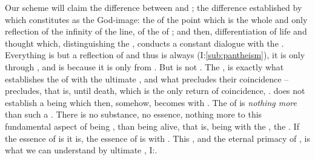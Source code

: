 Our scheme will claim the difference between  and ; the
difference established by  which constitutes  as the
God-image: the  of the point which is the whole and only
reflection of the infinity of the line, of the  of ; and
then, differentiation of life and thought which, distinguishing the
, conducts a constant dialogue with the . Everything is
but a reflection of  and thus  is always 
(I:\ref{sub:pantheism}), it is  only through , and
 is  because it is  only from . But
 is not .  The ,  is exactly what
establishes the  of  with the ultimate
, and what precludes their coincidence -- precludes, that is,
until death, which is the only return of coincidence, .
 does not establish a being which then, somehow, becomes
 with . The  of  is
{\em nothing more} than such a .  There is no substance, no
essence, nothing more to this fundamental aspect of being , than being
alive, that is, being  with the ,
 the .  If the essence of  is
 it is, the essence of  is  with .
This , and the eternal primacy of , is what we can
understand by  ultimate , I:.

